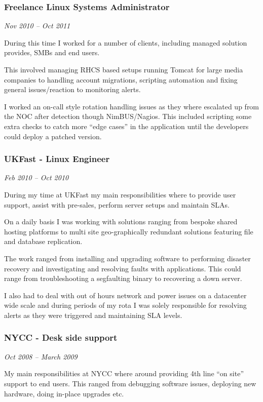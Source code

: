 \subsubsection{Freelance Linux Systems Administrator}

\emph{Nov 2010 -- Oct 2011}

During this time I worked for a number of clients, including managed
solution provides, SMBs and end users.

This involved managing RHCS based setups running Tomcat for large media
companies to handling account migrations, scripting automation and
fixing general issues/reaction to monitoring alerts.

I worked an on-call style rotation handling issues as they where
escalated up from the NOC after detection though NimBUS/Nagios. This
included scripting some extra checks to catch more ``edge cases'' in the
application until the developers could deploy a patched version.

\subsubsection{UKFast - Linux Engineer}

\emph{Feb 2010 -- Oct 2010}

During my time at UKFast my main responsibilities where to provide user
support, assist with pre-sales, perform server setups and maintain SLAs.

On a daily basis I was working with solutions ranging from bespoke
shared hosting platforms to multi site geo-graphically redundant
solutions featuring file and database replication.

The work ranged from installing and upgrading software to performing
disaster recovery and investigating and resolving faults with
applications. This could range from troubleshooting a segfaulting binary
to recovering a down server.

I also had to deal with out of hours network and power issues on a
datacenter wide scale and during periods of my rota I was solely
responsible for resolving alerts as they were triggered and maintaining
SLA levels.

\subsubsection{NYCC - Desk side support}

\emph{Oct 2008 -- March 2009}

My main responsibilities at NYCC where around providing 4th line ``on
site'' support to end users. This ranged from debugging software issues,
deploying new hardware, doing in-place upgrades etc.

